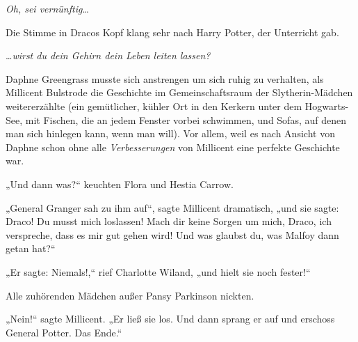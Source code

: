 \emph{Oh, sei vernünftig}…

Die Stimme in Dracos Kopf klang sehr nach Harry Potter, der Unterricht gab.

…\emph{wirst du dein Gehirn dein Leben leiten lassen?}


Daphne Greengrass musste sich anstrengen um sich ruhig zu verhalten, als Millicent Bulstrode die Geschichte im Gemeinschaftsraum der Slytherin-Mädchen weitererzählte (ein gemütlicher, kühler Ort in den Kerkern unter dem Hogwarts-See, mit Fischen, die an jedem Fenster vorbei schwimmen, und Sofas, auf denen man sich hinlegen kann, wenn man will). Vor allem, weil es nach Ansicht von Daphne schon ohne alle \emph{Verbesserungen} von Millicent eine perfekte Geschichte war.

„Und dann was?“ keuchten Flora und Hestia Carrow.

„General Granger sah zu ihm auf“, sagte Millicent dramatisch, „und sie sagte: Draco! Du musst mich loslassen! Mach dir keine Sorgen um mich, Draco, ich verspreche, dass es mir gut gehen wird! Und was glaubst du, was Malfoy dann getan hat?“

„Er sagte: Niemals!,“ rief Charlotte Wiland, „und hielt sie noch fester!“

Alle zuhörenden Mädchen außer Pansy Parkinson nickten.

„Nein!“ sagte Millicent. „Er ließ sie los. Und dann sprang er auf und erschoss General Potter. Das Ende.“


